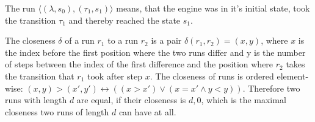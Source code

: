 The run \(\langle (\lambda, s_0), (\tau_1, s_1) \rangle\) means, that the engine was in it's initial state, took the transition \(\tau_1\) and thereby reached the state \(s_1\).





\begin{definition}[name = Closeness of Runs]\label{def:runs_closeness}
  The closeness \(\delta\) of a run \(r_1\) to a run \(r_2\) is a pair \(\delta(r_1,r_2) = (x,y)\), where \(x\) is the index before the first position where the two runs differ and y is the number of steps between the index of the first difference and the position where \(r_2\) takes the transition that \(r_1\) took after step \(x\).
  The closeness of runs is ordered element-wise: \((x,y) > (x',y') \leftrightarrow ((x > x') \lor (x = x' \land y < y))\).
  Therefore two runs with length \(d\) are equal, if their closeness is \(d,0\), which is the maximal closeness two runs of length \(d\) can have at all.
\end{definition}

